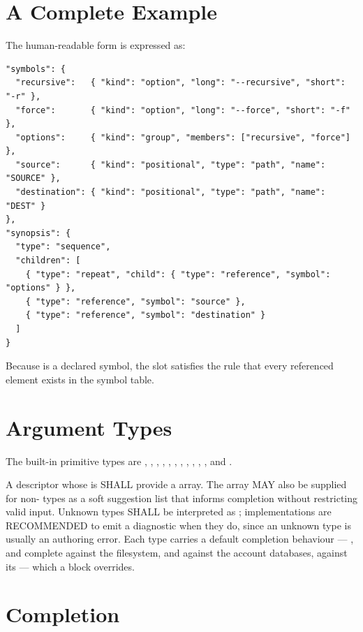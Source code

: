 \section{A Complete Example}

The human-readable form  is expressed as:

\begin{lstlisting}
"symbols": {
  "recursive":   { "kind": "option", "long": "--recursive", "short": "-r" },
  "force":       { "kind": "option", "long": "--force", "short": "-f" },
  "options":     { "kind": "group", "members": ["recursive", "force"] },
  "source":      { "kind": "positional", "type": "path", "name": "SOURCE" },
  "destination": { "kind": "positional", "type": "path", "name": "DEST" }
},
"synopsis": {
  "type": "sequence",
  "children": [
    { "type": "repeat", "child": { "type": "reference", "symbol": "options" } },
    { "type": "reference", "symbol": "source" },
    { "type": "reference", "symbol": "destination" }
  ]
}
\end{lstlisting}

Because  is a declared symbol, the \code{[OPTION...]} slot satisfies the rule that every referenced element exists in the symbol table.

\section{Argument Types}

The built-in primitive types are , , , , , , , , , , ,  and .

A descriptor whose  is  SHALL provide a  array. The  array MAY also be supplied for non- types as a soft suggestion list that informs completion without restricting valid input. Unknown types SHALL be interpreted as ; implementations are RECOMMENDED to emit a diagnostic when they do, since an unknown type is usually an authoring error. Each type carries a default completion behaviour --- ,  and  complete against the filesystem,  and  against the account databases,  against its  --- which a  block overrides.

\section{Completion}

